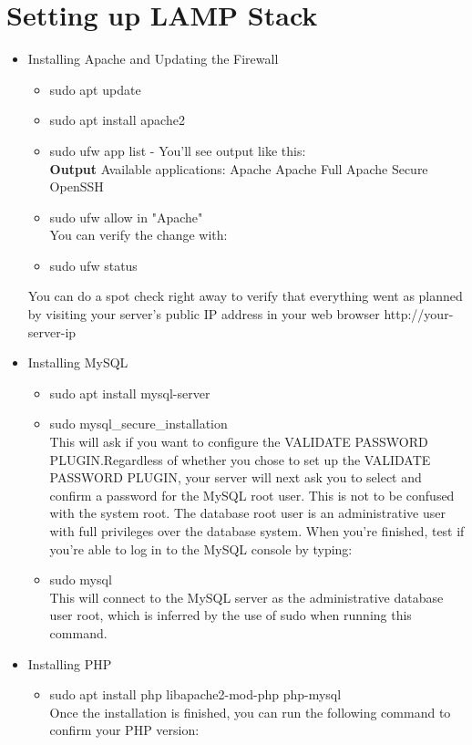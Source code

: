 \documentclass[10pt]{report}
\begin{document}
\section{Setting up LAMP Stack}
\begin{itemize}
\item{Installing Apache and Updating the Firewall}
\begin{itemize}
\item{sudo apt update}
\item{sudo apt install apache2}
\item{sudo ufw app list - You’ll see output like this: \\
\textbf{Output}
Available applications:
Apache
Apache Full
Apache Secure
OpenSSH}
\item{sudo ufw allow in "Apache"}
\\ You can verify the change with:
\item{sudo ufw status}
\end{itemize}
You can do a spot check right away to verify that everything went as planned by visiting your server’s public IP address in your web browser
http://your-server-ip 
\item{Installing MySQL}
\begin{itemize}
\item{sudo apt install mysql-server}
\item{sudo mysql\_secure\_installation} \\
This will ask if you want to configure the VALIDATE PASSWORD PLUGIN.Regardless of whether you chose to set up the VALIDATE PASSWORD PLUGIN, your server will next ask you to select and confirm a password for the MySQL root user. This is not to be confused with the system root. The database root user is an administrative user with full privileges over the database system. When you’re finished, test if you’re able to log in to the MySQL console by typing:
\item{sudo mysql} \\
This will connect to the MySQL server as the administrative database user root, which is inferred by the use of sudo when running this command.
\end{itemize}
\item{Installing PHP}
\begin{itemize}
\item{sudo apt install php libapache2-mod-php php-mysql}
\\ Once the installation is finished, you can run the following command to confirm your PHP version:

\end{itemize}
\end{itemize}
\end{document}

